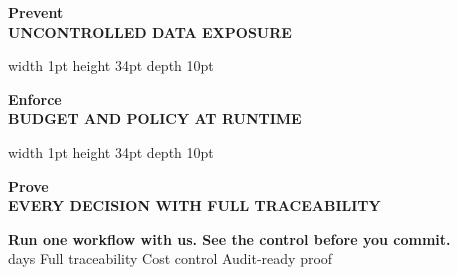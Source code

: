 \documentclass[9pt]{article}
\begin{document}
\noindent
\begin{tcolorbox}[enhanced, colframe=textnavy!12, boxrule=0.6pt, arc=6pt,
  interior style={top color=white, bottom color=brandblue!03},
  drop fuzzy shadow=black!6, left=0pt, right=0pt, top=10pt, bottom=10pt]
\begin{minipage}[c]{0.33\linewidth}\centering
  {\fontsize{20}{24}\selectfont\bfseries\color{brandblue}Prevent}%
  \\[2pt]
  {\fontsize{7.5}{9}\selectfont\color{textnavy}\bfseries UNCONTROLLED DATA EXPOSURE}
\end{minipage}%
\textcolor{textnavy!10}{\vrule width 1pt height 34pt depth 10pt}%
\begin{minipage}[c]{0.33\linewidth}\centering
  {\fontsize{20}{24}\selectfont\bfseries\color{probicon}Enforce}%
  \\[2pt]
  {\fontsize{7.5}{9}\selectfont\color{textnavy}\bfseries BUDGET AND POLICY AT RUNTIME}
\end{minipage}%
\textcolor{textnavy!10}{\vrule width 1pt height 34pt depth 10pt}%
\begin{minipage}[c]{0.33\linewidth}\centering
  {\fontsize{20}{24}\selectfont\bfseries\color{brandblue}Prove}\\[2pt]
  {\fontsize{7.5}{9}\selectfont\color{textnavy}\bfseries EVERY DECISION WITH FULL TRACEABILITY}
\end{minipage}
\end{tcolorbox}

\vspace{10pt}

\begin{tcolorbox}[enhanced,
  interior style={left color=ctabg, right color=ctabg!80!probicon},
  colframe=ctabg, arc=8pt,
  drop fuzzy shadow=black!35, halign=center, top=12pt, bottom=12pt]
  {\fontsize{14}{17}\selectfont\bfseries\color{white}%
    Run one workflow with us. See the control before you commit.}\\[5pt]
  {\fontsize{10}{12}\selectfont\color{white!80}%
    \faHandshake{} days \enspace\textbar\enspace Full traceability \enspace\textbar\enspace Cost control \enspace\textbar\enspace Audit-ready proof}
\end{tcolorbox}
\end{document}
